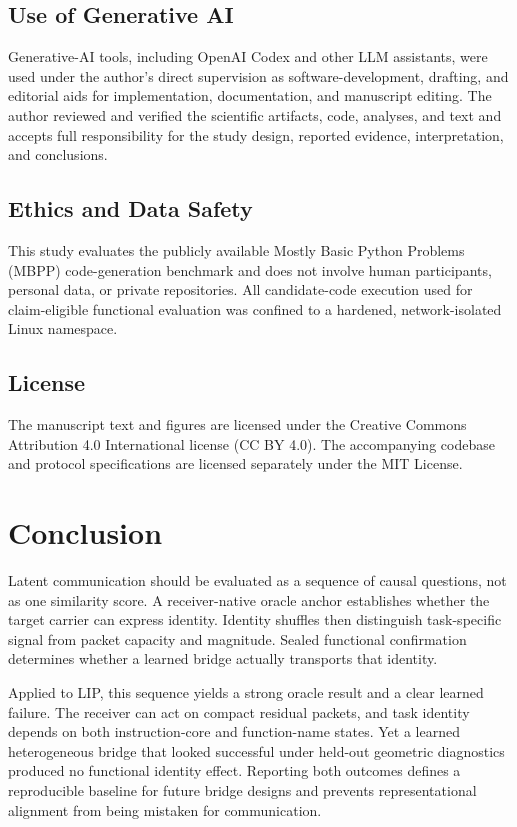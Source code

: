 \documentclass[11pt]{article}
\begin{document}
\subsection{Use of Generative AI}

Generative-AI tools, including OpenAI Codex and other LLM assistants, were used under the author's direct supervision as software-development, drafting, and editorial aids for implementation, documentation, and manuscript editing. The author reviewed and verified the scientific artifacts, code, analyses, and text and accepts full responsibility for the study design, reported evidence, interpretation, and conclusions.

\subsection{Ethics and Data Safety}

This study evaluates the publicly available Mostly Basic Python Problems (MBPP) code-generation benchmark and does not involve human participants, personal data, or private repositories. All candidate-code execution used for claim-eligible functional evaluation was confined to a hardened, network-isolated Linux namespace.

\subsection{License}

The manuscript text and figures are licensed under the Creative Commons Attribution 4.0 International license (CC BY 4.0). The accompanying codebase and protocol specifications are licensed separately under the MIT License.

\section{Conclusion}

Latent communication should be evaluated as a sequence of causal questions, not as one similarity score. A receiver-native oracle anchor establishes whether the target carrier can express identity. Identity shuffles then distinguish task-specific signal from packet capacity and magnitude. Sealed functional confirmation determines whether a learned bridge actually transports that identity.

Applied to LIP, this sequence yields a strong oracle result and a clear learned failure. The receiver can act on compact residual packets, and task identity depends on both instruction-core and function-name states. Yet a learned heterogeneous bridge that looked successful under held-out geometric diagnostics produced no functional identity effect. Reporting both outcomes defines a reproducible baseline for future bridge designs and prevents representational alignment from being mistaken for communication.
\end{document}
